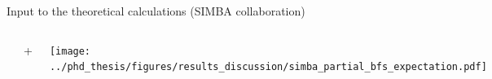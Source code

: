 \documentclass[xcolor=dvipsnames]{beamer}
\begin{document}
\begin{frame}{Input to the theoretical calculations (SIMBA collaboration)}
\centering\scriptsize
\begin{columns}
   \centering
   \centering\scriptsize

   \includegraphics[width=0.45\textwidth]{figures/babar_hadtag_spec_default_la055_a3.pdf}
   \includegraphics[width=0.45\textwidth]{figures/babar_incl_spec_default_la055_a3.pdf}
   \includegraphics[width=0.45\textwidth]{figures/babar_sem_spec_default_la055_a3.pdf}
   \includegraphics[width=0.45\textwidth]{figures/belle_spec_default_la055_a3.pdf}
   
   {\Large +}
   
   \texttt{[image: ../phd\_thesis/figures/results\_discussion/simba\_partial\_bfs\_expectation.pdf]}


\end{columns}
\end{frame}
\end{document}
